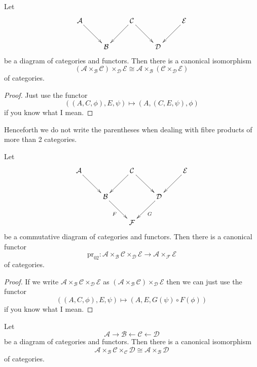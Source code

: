 \begin{lemma}
\label{lemma-associativity-2-fibre-product}
Let
$$
\xymatrix{
\mathcal{A} \ar[rd] & & \mathcal{C} \ar[ld] \ar[rd] & & \mathcal{E} \ar[ld] \\
& \mathcal{B} & & \mathcal{D}
}
$$
be a diagram of categories and functors.
Then there is a canonical isomorphism
$$
(\mathcal{A} \times_\mathcal{B} \mathcal{C}) \times_\mathcal{D} \mathcal{E}
\cong
\mathcal{A} \times_\mathcal{B} (\mathcal{C} \times_\mathcal{D} \mathcal{E})
$$
of categories.
\end{lemma}

\begin{proof}
Just use the functor
$$
((A, C, \phi), E, \psi)
\longmapsto
(A, (C, E, \psi), \phi)
$$
if you know what I mean.
\end{proof}

\noindent
Henceforth we do not write the parentheses when dealing with fibre products
of more than 2 categories.

\begin{lemma}
\label{lemma-triple-2-fibre-product-pr02}
Let
$$
\xymatrix{
\mathcal{A} \ar[rd] & & \mathcal{C} \ar[ld] \ar[rd] & & \mathcal{E} \ar[ld] \\
& \mathcal{B} \ar[rd]_F & & \mathcal{D} \ar[ld]^G \\
& & \mathcal{F} &
}
$$
be a commutative diagram of categories and functors.
Then there is a canonical functor
$$
\text{pr}_{02} :
\mathcal{A} \times_\mathcal{B} \mathcal{C} \times_\mathcal{D} \mathcal{E}
\longrightarrow
\mathcal{A} \times_\mathcal{F} \mathcal{E}
$$
of categories.
\end{lemma}

\begin{proof}
If we write
$\mathcal{A} \times_\mathcal{B} \mathcal{C}
\times_\mathcal{D} \mathcal{E}$
as
$(\mathcal{A} \times_\mathcal{B} \mathcal{C})
\times_\mathcal{D} \mathcal{E}$
then we can just use the functor
$$
((A, C, \phi), E, \psi)
\longmapsto
(A, E, G(\psi) \circ F(\phi))
$$
if you know what I mean.
\end{proof}

\begin{lemma}
\label{lemma-2-fibre-product-erase-factor}
Let
$$
\mathcal{A} \to
\mathcal{B} \leftarrow \mathcal{C} \leftarrow \mathcal{D}
$$
be a diagram of categories and functors.
Then there is a canonical isomorphism
$$
\mathcal{A} \times_\mathcal{B} \mathcal{C} \times_\mathcal{C} \mathcal{D}
\cong
\mathcal{A} \times_\mathcal{B} \mathcal{D}
$$
of categories.
\end{lemma}

